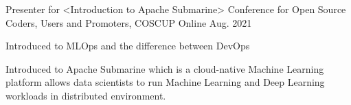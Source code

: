 

\begin{cventries}

  \cventry
    {Presenter for <Introduction to Apache Submarine>} %
    {Conference for Open Source Coders, Users and Promoters, COSCUP} %
    {Online} %
    {Aug. 2021} %
    {
      \begin{cvitems} %
        \item {Introduced to MLOps and the difference between DevOps}
        \item {Introduced to Apache Submarine which is a cloud-native Machine Learning platform allows data scientists to run Machine Learning and Deep Learning workloads in distributed environment.}
      \end{cvitems}
    }
\end{cventries}
